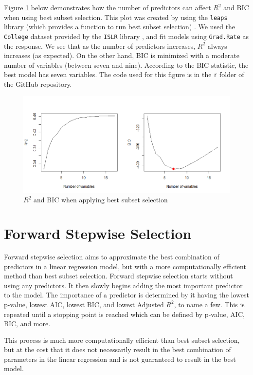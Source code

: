 \documentclass{article}
\begin{document}
Figure \ref{fig:best-subset-selection} below demonstrates how the number of predictors can affect $R^2$ and BIC when using best subset selection. This plot was created by using the \lstinline!leaps! library (which provides a function to run best subset selection) \cite{lumley2020leaps}. We used the \lstinline!College! dataset provided by the \lstinline!ISLR! library \cite{james2017islr}, and fit models using \lstinline!Grad.Rate! as the response. We see that as the number of predictors increases, $R^2$ always increases (as expected). On the other hand, BIC is minimized with a moderate number of variables (between seven and nine). According to the BIC statistic, the best model has seven variables. The code used for this figure is in the \lstinline!r! folder of the GitHub repository.

\begin{figure}[!h]
	\label{fig:best-subset-selection}
	\centering
	\caption{$R^2$ and BIC when applying best subset selection}
	\includegraphics[width = 6in]{best-subset-selection.png}
\end{figure}

\section{Forward Stepwise Selection}
Forward stepwise selection aims to approximate the best combination of predictors in a linear regression model, but with a more computationally efficient method than best subset selection. Forward stepwise selection starts without using any predictors. It then slowly begins adding the most important predictor to the model. The importance of a predictor is determined by it having the lowest p-value, lowest AIC, lowest BIC, and lowest Adjusted $R^2$, to name a few. This is repeated until a stopping point is reached which can be defined by p-value, AIC, BIC, and more.

This process is much more computationally efficient than best subset selection, but at the cost that it does not necessarily result in the best combination of parameters in the linear regression and is not guaranteed to result in the best model.
\end{document}
